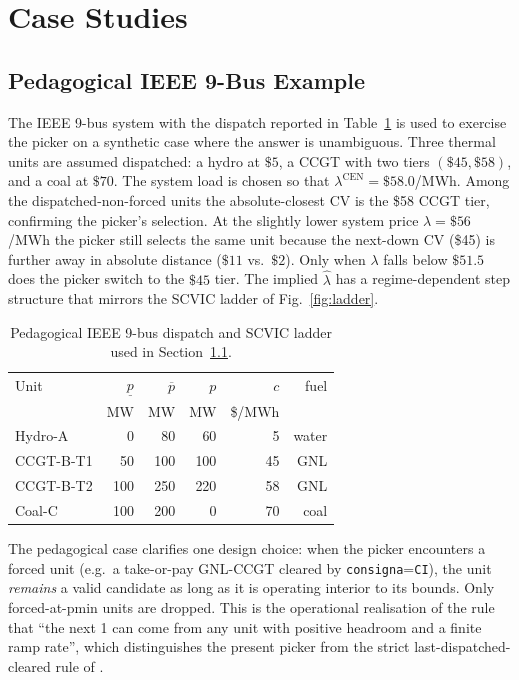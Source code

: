 \section{Case Studies}
\label{sec:cases}

\subsection{Pedagogical IEEE 9-Bus Example}
\label{sec:cases-9bus}

The IEEE 9-bus system with the dispatch reported in
Table~\ref{tab:9bus-dispatch} is used to exercise the picker on a
synthetic case where the answer is unambiguous.  Three thermal
units are assumed dispatched: a hydro at $\$5$, a CCGT with two
tiers $(\$45, \$58)$, and a coal at $\$70$.  The system load is
chosen so that $\lambda^{\mathrm{CEN}}=\$58.0$/MWh.  Among the
dispatched-non-forced units the absolute-closest CV is the
\$58 CCGT tier, confirming the picker's selection.  At the slightly
lower system price $\lambda=\$56$/MWh the picker still selects
the same unit because the next-down CV (\$45) is further away in
absolute distance ($\$11$ vs.\ $\$2$).  Only when $\lambda$ falls
below $\$51.5$ does the picker switch to the $\$45$ tier.  The
implied $\hat\lambda$ has a regime-dependent step structure that
mirrors the SCVIC ladder of Fig.~\ref{fig:ladder}.

\begin{table}[h]
  \centering
  \caption{Pedagogical IEEE 9-bus dispatch and SCVIC ladder used
  in Section~\ref{sec:cases-9bus}.}
  \label{tab:9bus-dispatch}
  \begin{tabular}{lrrrrr}
    \toprule
    Unit & $\underline{p}$ & $\overline{p}$ & $p$ & $c$ &
    fuel \\
    & MW & MW & MW & \$/MWh & \\
    \midrule
    Hydro-A   & 0   & 80  & 60  & 5   & water \\
    CCGT-B-T1 & 50  & 100 & 100 & 45  & GNL \\
    CCGT-B-T2 & 100 & 250 & 220 & 58  & GNL \\
    Coal-C    & 100 & 200 & 0   & 70  & coal \\
    \bottomrule
  \end{tabular}
\end{table}

The pedagogical case clarifies one design choice: when the picker
encounters a forced unit (e.g.\ a take-or-pay GNL-CCGT cleared by
\texttt{consigna}=\texttt{CI}), the unit \emph{remains} a valid
candidate as long as it is operating interior to its bounds.  Only
forced-at-pmin units are dropped.  This is the operational
realisation of the rule that ``the next \SI{1}{\MWh} can come from
any unit with positive headroom and a finite ramp rate'', which
distinguishes the present picker from the strict
last-dispatched-cleared rule of \cite{SilerEvans2012}.

